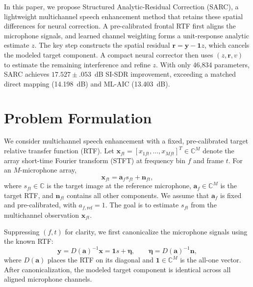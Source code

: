 \documentclass{article}
\begin{document}
In this paper, we propose Structured Analytic-Residual Correction
(SARC), a lightweight multichannel speech enhancement method that
retains these spatial differences for neural correction. A
pre-calibrated frontal RTF first aligns the microphone signals, and
learned channel weighting forms a unit-response analytic estimate
$z$. The key step constructs the spatial residual
$\mathbf r=\mathbf y-\mathbf1 z$, which cancels the modeled target
component. A compact neural corrector then uses $(z,\mathbf r,v)$ to estimate the
remaining interference and refine $z$.
With only 46,834 parameters,
SARC achieves $17.527\!\pm\!.053$~dB SI-SDR improvement, exceeding a
matched direct mapping (14.198~dB) and ML-AIC (13.403~dB).


\section{Problem Formulation}
\label{sec:problem}

We consider multichannel speech enhancement with a fixed,
pre-calibrated target relative transfer function (RTF).
Let
$\mathbf{x}_{ft}=[x_{1ft},\ldots,x_{Mft}]^T\in\mathbb{C}^M$
denote the array short-time Fourier transform (STFT) at frequency
bin $f$ and frame $t$. For an $M$-microphone array,
\begin{equation}
	\mathbf{x}_{ft}
	=
	\mathbf{a}_f s_{ft}
	+
	\mathbf{n}_{ft},
	\label{eq:obs}
\end{equation}
where $s_{ft}\in\mathbb{C}$ is the target image at the reference
microphone, $\mathbf{a}_f\in\mathbb{C}^M$ is the target RTF, and
$\mathbf{n}_{ft}$ contains all other components. We assume that
$\mathbf{a}_f$ is fixed and pre-calibrated, with
$a_{f,\mathrm{ref}}=1$. The goal is to estimate $s_{ft}$ from the
multichannel observation $\mathbf{x}_{ft}$.

Suppressing $(f,t)$ for clarity, we first canonicalize the
microphone signals using the known RTF:
\begin{equation}
	\mathbf{y}
	=
	D(\mathbf{a})^{-1}\mathbf{x}
	=
	\mathbf{1}s+\boldsymbol{\eta},
	\qquad
	\boldsymbol{\eta}
	=
	D(\mathbf{a})^{-1}\mathbf{n},
	\label{eq:canonical}
\end{equation}
where $D(\mathbf{a})$ places the RTF on its diagonal and
$\mathbf{1}\in\mathbb{C}^M$ is the all-one vector.
After canonicalization, the modeled target component is identical
across all aligned microphone channels.
\end{document}

